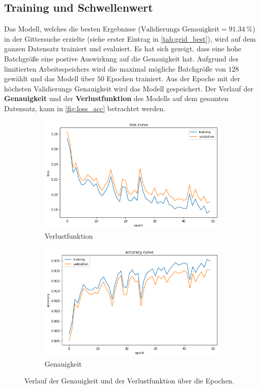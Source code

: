 \subsection{Training und Schwellenwert}
Das Modell, welches die besten Ergebnisse ($\text{Validierungs Genauigkeit} = \SI{91.34}{\percent}$) in der Gittersuche erzielte (siehe erster Eintrag in \autoref{tab:grid_best}), wird auf dem ganzen Datensatz trainiert und evaluiert.
Es hat sich gezeigt, dass eine hohe Batchgröße eine postive Auswirkung auf die Genauigkeit hat.
Aufgrund des limitierten Arbeitsspeichers wird die maximal mögliche Batchgröße von $128$ gewählt und das Modell über $50$ Epochen trainiert.
Aus der Epoche mit der höchsten Validierungs Genauigkeit wird das Modell gespeichert.
Der Verlauf der \textbf{Genauigkeit} und der \textbf{Verlustfunktion} des Modells auf dem gesamten Datensatz, kann in \autoref{fig:loss_acc} betrachtet werden.
\begin{figure}
    \centering
    \begin{subfigure}{0.48\textwidth}
        \centering
        \includegraphics[width=\textwidth]{content/img/loss.png}
        \caption{Verlustfunktion}
    \end{subfigure}
    \begin{subfigure}{0.48\textwidth}
        \centering
        \includegraphics[width=\textwidth]{content/img/acc.png}
        \caption{Genauigkeit}
    \end{subfigure}
    \caption{Verlauf der Genauigkeit und der Verlustfunktion über die Epochen.}
    \label{fig:loss_acc}
\end{figure}

